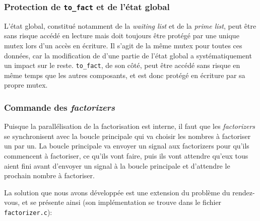 \documentclass[a4paper,10pt]{article}
\begin{document}
\subsubsection*{Protection de \texttt{to\_fact} et de l'état global}

L'état global, constitué notamment de la \emph{waiting list} et de la \emph{prime list}, peut être sans risque accédé en lecture mais doit toujours être protégé par une unique mutex lors d'un accès en écriture. Il s'agit de la même mutex pour toutes ces données, car la modification de d'une partie de l'état global a systématiquement un impact sur le reste. \texttt{to\_fact}, de son côté, peut être accédé sans risque en même temps que les autres composants, et est donc protégé en écriture par sa propre mutex.

\subsubsection*{Commande des \emph{factorizers}}

Puisque la parallélisation de la factorisation est interne, il faut que les \emph{factorizers} se synchronisent avec la boucle principale qui va choisir les nombres à factoriser un par un. La boucle principale va envoyer un signal aux factorizers pour qu'ils commencent à factoriser, ce qu'ils vont faire, puis ils vont attendre qu'eux tous aient fini avant d'envoyer un signal à la boucle principale et d'attendre le prochain nombre à factoriser.

La solution que nous avons développée est une extension du problème du rendez-vous, et se présente ainsi (son implémentation se trouve dans le fichier \texttt{factorizer.c}):

\end{document}
